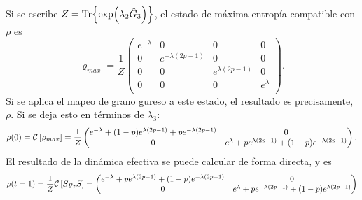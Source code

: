 Si se escribe $Z=\Tr{\exp(\lambda_{2}\hat{G}_{3})}$, el estado de máxima entropía compatible con $\rho$ es
\begin{equation}
\varrho_{max}=\frac{1}{Z}\begin{pmatrix}
 e^{-\lambda } & 0 & 0 & 0 \\
 0 & e^{-\lambda  (2 p-1)} & 0 & 0 \\
 0 & 0 & e^{\lambda  (2 p-1)} & 0 \\
 0 & 0 & 0 & e^{\lambda } \\
\end{pmatrix}.
\end{equation}
Si se aplica el mapeo de grano gureso a este estado, el resultado es precisamente, $\rho$. Si se deja esto en términos de $\lambda_{3}$:
\begin{equation}
\rho(0)=\mathcal{C}\left[\varrho_{max}\right]=\frac{1}{Z}\begin{pmatrix}
 e^{-\lambda }+(1-p)e^{\lambda  (2 p-1)}+p e^{-\lambda  (2 p-1)} & 0 \\
 0 & e^{\lambda }+p e^{\lambda  (2 p-1)}+(1-p)e^{-\lambda  (2 p-1)} \\
\end{pmatrix}.
\end{equation}
El resultado de la dinámica efectiva se puede calcular de forma directa, y es
\begin{equation}
\rho(t=1)=\frac{1}{Z}\mathcal{C}\left[S\varrho_{z} S\right]=
\begin{pmatrix}
 e^{-\lambda }+p e^{\lambda  (2 p-1)}+(1-p) e^{-\lambda  (2 p-1)} & 0 \\
 0 & e^{\lambda }+p e^{-\lambda  (2 p-1)}+(1-p)e^{\lambda  (2 p-1)} \\
\end{pmatrix}
\end{equation}
